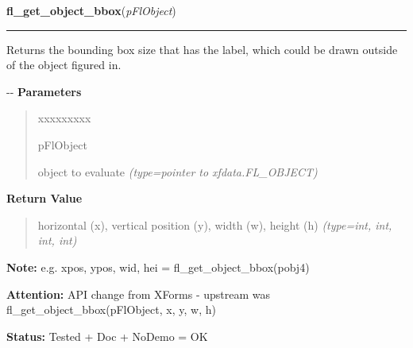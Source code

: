 \hspace{.8\funcindent}\begin{boxedminipage}{\funcwidth}

    \raggedright \textbf{fl\_get\_object\_bbox}(\textit{pFlObject})

    \vspace{-1.5ex}

    \rule{\textwidth}{0.5\fboxrule}
\setlength{\parskip}{2ex}

Returns the bounding box size that has the label, which could be drawn
outside of the object figured in.

-{}-
\setlength{\parskip}{1ex}
      \textbf{Parameters}
      \vspace{-1ex}

      \begin{quote}
        \begin{Ventry}{xxxxxxxxx}

          \item[pFlObject]


object to evaluate
            {\it (type=pointer to xfdata.FL\_OBJECT)}

        \end{Ventry}

      \end{quote}

      \textbf{Return Value}
    \vspace{-1ex}

      \begin{quote}

horizontal (x), vertical position (y), width (w), height (h)
      {\it (type=int, int, int, int)}

      \end{quote}

\textbf{Note:} 
e.g. xpos, ypos, wid, hei = fl\_get\_object\_bbox(pobj4)


\textbf{Attention:} 
API change from XForms - upstream was
fl\_get\_object\_bbox(pFlObject, x, y, w, h)


\textbf{Status:} 
Tested + Doc + NoDemo = OK


    \end{boxedminipage}

    \label{xformslib:flbasic:fl_get_object_bbox}

    \vspace{0.5ex}

